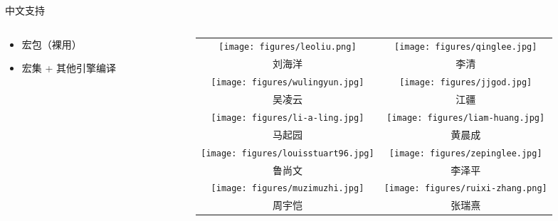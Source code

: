 \begin{frame}{中文支持}
\begin{columns}
\begin{column}{0.66\textwidth}
\begin{itemize}
      \begin{itemize}
        \item {} 宏包（裸用）
        \item {} 宏集 + 其他引擎编译
      \end{itemize}
  \end{itemize}
\end{column} \pause
\begin{column}{0.32\textwidth}
  \tiny
  \begin{tabular}{cc}
    \texttt{[image: figures/leoliu.png]}        &
    \texttt{[image: figures/qinglee.jpg]}       \\
    刘海洋 & 李清 \\[2ex]
    \texttt{[image: figures/wulingyun.jpg]}     &
    \texttt{[image: figures/jjgod.jpg]}         \\
    吴凌云 & 江疆 \\[2ex]
    \texttt{[image: figures/li-a-ling.jpg]}     &
    \texttt{[image: figures/liam-huang.jpg]}    \\
    马起园 & 黄晨成 \\[2ex]
    \texttt{[image: figures/louisstuart96.jpg]} &
    \texttt{[image: figures/zepinglee.jpg]}     \\
    鲁尚文 & 李泽平 \\[2ex]
    \texttt{[image: figures/muzimuzhi.jpg]}     &
    \texttt{[image: figures/ruixi-zhang.png]}   \\
    周宇恺 & 张瑞熹
  \end{tabular}
  \vspace{-0.6cm}
\end{column}
\end{columns}
\end{frame}

